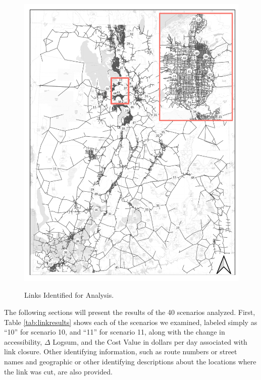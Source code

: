 \begin{figure}

{\centering \includegraphics[width=0.95\linewidth]{figures/chapter4/resiliency_links_map.pdf}}

\caption{Links Identified for Analysis.}
\label{fig:linksmap}
\end{figure}

The following sections will present the results of the 40 scenarios analyzed.
First, Table \ref{tab:linkresults} shows each of the scenarios we examined,
labeled simply as ``10'' for scenario 10, and ``11'' for scenario 11, along with the
change in accessibility, $\Delta$ Logsum, and the Cost Value in dollars per day
associated with link closure. Other identifying information, such as route
numbers or street names and geographic or other identifying descriptions about
the locations where the link was cut, are also provided.

